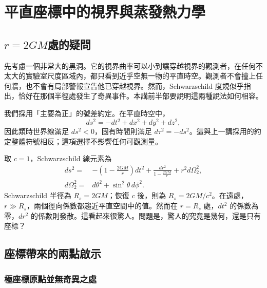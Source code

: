 \chapter{平直座標中的視界與蒸發熱力學}


\section{\texorpdfstring{\(r=2GM\)}{r=2GM}處的疑問}

先考慮一個非常大的黑洞。它的視界曲率可以小到讓穿越視界的觀測者，在任何不太大的實驗室尺度區域內，都只看到近乎空無一物的平直時空。觀測者不會撞上任何牆，也不會有局部警報宣告他已穿越視界。然而，Schwarzschild 度規似乎指出，恰好在那個半徑處發生了奇異事件。本講前半部要說明這兩種說法如何相容。

我們採用「主要為正」的號差約定。在平直時空中，
\begin{equation}
ds^2=-dt^2+dx^2+dy^2+dz^2,
\end{equation}
因此類時世界線滿足 \(ds^2<0\)，固有時間則滿足 \(d\tau^2=-ds^2\)。這與上一講採用的約定整體符號相反；這項選擇不影響任何可觀測量。

取 \(c=1\)，Schwarzschild 線元素為
\begin{equation}
\begin{aligned}
ds^2={}&-\left(1-\frac{2GM}{r}\right)dt^2
+\frac{dr^2}{1-\frac{2GM}{r}}
+r^2d\Omega_2^2,\\
d\Omega_2^2={}&d\theta^2+\sin^2\theta\,d\phi^2 .
\end{aligned}
\label{eq:l03-schwarzschild}
\end{equation}
Schwarzschild 半徑為 \(R_s=2GM\)；恢復 \(c\) 後，則為 \(R_s=2GM/c^2\)。在遠處，\(r\gg R_s\)，兩個徑向係數都趨近平直空間中的值。然而在 \(r=R_s\) 處，\(dt^2\) 的係數為零，\(dr^2\) 的係數則發散。這看起來很驚人。問題是，驚人的究竟是幾何，還是只有座標？

\section{座標帶來的兩點啟示}

\subsection{極座標原點並無奇異之處}

